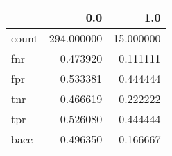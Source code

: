 \begin{tabular}{lrr}
\toprule
{} &         0.0 &        1.0 \\
\midrule
count &  294.000000 &  15.000000 \\
fnr   &    0.473920 &   0.111111 \\
fpr   &    0.533381 &   0.444444 \\
tnr   &    0.466619 &   0.222222 \\
tpr   &    0.526080 &   0.444444 \\
bacc  &    0.496350 &   0.166667 \\
\bottomrule
\end{tabular}
